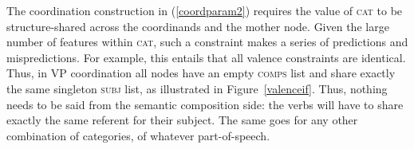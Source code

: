 \documentclass[output=paper
                ,modfonts
                ,nonflat
	        ,collection
	        ,collectionchapter
	        ,collectiontoclongg
 	        ,biblatex
                ,babelshorthands
                ,newtxmath
                ,draftmode
                ,colorlinks, citecolor=brown
]{./langsci/langscibook}
\begin{document}
The coordination construction in (\ref{coordparam2}) requires the value of \textsc{cat} to be structure-shared across the coordinands and the mother node. Given the large number of features within \textsc{cat}, such a constraint makes a series of predictions and mispredictions.
For example, this entails that all valence constraints are identical. Thus, in VP coordination all nodes have an empty \textsc{comps} list and share exactly the same singleton \textsc{subj} list, as illustrated in Figure~\ref{valenceif}. Thus, nothing needs to be said from the semantic composition side: the verbs will have to share exactly the same referent for their subject. The same goes for any other combination of categories, of whatever part-of-speech.

\end{document}
